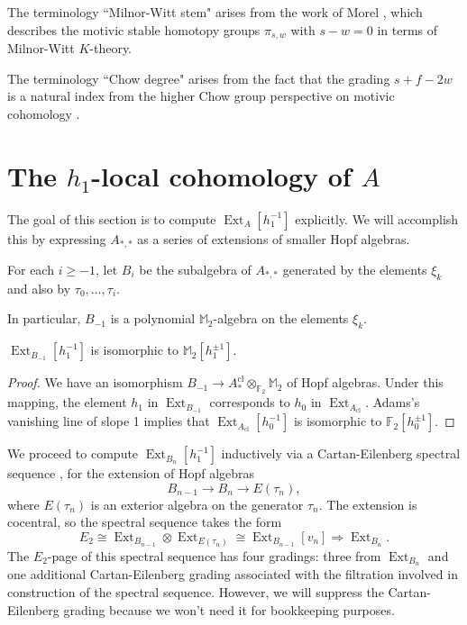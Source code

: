 \documentclass[10pt]{amsart}
\begin{document}
The terminology ``Milnor-Witt stem" arises from the work of Morel
\cite{Morel}, which describes the motivic stable homotopy groups
$\pi_{s,w}$ with $s-w=0$ in terms of Milnor-Witt $K$-theory.

The terminology ``Chow degree" arises from the fact that the 
grading $s+f-2w$ is a natural index from the higher Chow group perspective
on motivic cohomology \cite{Bloch}.

\section{The $h_1$-local cohomology of $A$}
\label{sec:CohomA}

The goal of this section is to compute $\operatorname{Ext}_A[h_1^{-1}]$ explicitly.
We will accomplish this by
expressing $A_{*,*}$ as a series of extensions of smaller Hopf algebras.

\begin{defn}
\label{defn:Bi}
For each $i\geq -1$, let $B_i$ be the subalgebra of $A_{*,*}$
generated by the elements $\xi_k$ and also by $\tau_0,\dots,\tau_i$. 
\end{defn}

In particular, $B_{-1}$ is a polynomial ${\ensuremath{\mathbb{M}}}_2$-algebra on the elements $\xi_k$.

\begin{lemma}
\label{lem:B-1}
$\operatorname{Ext}_{B_{-1}}[h_1^{-1}]$ is isomorphic to
${\ensuremath{\mathbb{M}}}_2[h_1^{\pm 1}]$.
\end{lemma}

\begin{proof}
We have an isomorphism 
$B_{-1} {\longrightarrow} A_*^{\mathrm{cl}}\otimes_{{\ensuremath{\mathbb{F}}}_2}{\ensuremath{\mathbb{M}}}_2$
of Hopf algebras.
Under this mapping, the element $h_1$ in $\operatorname{Ext}_{B_{-1}}$
corresponds to $h_0$ in $\operatorname{Ext}_{A_{\mathrm{cl}}}$.
Adams's vanishing line of slope 1 \cite{A} implies that
$\operatorname{Ext}_{A_{\mathrm{cl}}}[h_0^{-1}]$ is isomorphic to ${\ensuremath{\mathbb{F}}}_2[h_0^{\pm 1}]$.
\end{proof}

We proceed to compute $\operatorname{Ext}_{B_n}[h_1^{-1}]$ inductively via a Cartan-Eilenberg spectral sequence 
\cite[\S XVI.6]{CE}, \cite[A1.3.14]{R}
for the extension of Hopf algebras
\[ B_{n-1}{\longrightarrow} B_n {\longrightarrow} E(\tau_n),\]
where $E(\tau_n)$ is an exterior algebra on the generator $\tau_n$.
The extension is cocentral, so the spectral sequence takes the form
\[ E_2 {\cong} \operatorname{Ext}_{B_{n-1}}\otimes \operatorname{Ext}_{E(\tau_n)} {\cong} \operatorname{Ext}_{B_{n-1}}[v_n] \Rightarrow \operatorname{Ext}_{B_n}.\] 
The $E_2$-page of this spectral sequence has four gradings: 
three from $\operatorname{Ext}_{B_n}$ and one additional Cartan-Eilenberg grading associated
with the filtration involved in construction of the spectral sequence.
However, we will suppress the Cartan-Eilenberg grading because we won't need
it for bookkeeping purposes.
\end{document}

